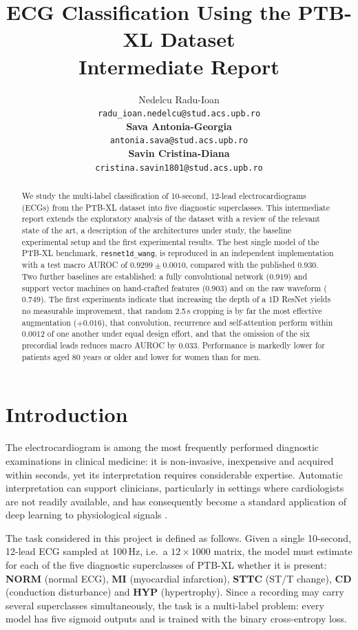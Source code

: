\documentclass{article}
\title{ECG Classification Using the PTB-XL Dataset\\[2pt]\large Intermediate Report}
\author{%
  Nedelcu Radu-Ioan\\
  \texttt{radu\_ioan.nedelcu@stud.acs.upb.ro}\\[4pt]
  \textbf{Sava Antonia-Georgia}\\
  \texttt{antonia.sava@stud.acs.upb.ro}\\[4pt]
  \textbf{Savin Cristina-Diana}\\
  \texttt{cristina.savin1801@stud.acs.upb.ro}
}
\newcommand{\wang}{\texttt{resnet1d\_wang}}
\begin{document}
\maketitle

\begin{abstract}
We study the multi-label classification of 10-second, 12-lead electrocardiograms (ECGs) from the PTB-XL dataset into five diagnostic superclasses. This intermediate report extends the exploratory analysis of the dataset with a review of the relevant state of the art, a description of the architectures under study, the baseline experimental setup and the first experimental results. The best single model of the PTB-XL benchmark, \wang{}, is reproduced in an independent implementation with a test macro AUROC of $0.9299\pm0.0010$, compared with the published $0.930$. Two further baselines are established: a fully convolutional network ($0.919$) and support vector machines on hand-crafted features ($0.903$) and on the raw waveform ($0.749$). The first experiments indicate that increasing the depth of a 1D ResNet yields no measurable improvement, that random 2.5\,s cropping is by far the most effective augmentation ($+0.016$), that convolution, recurrence and self-attention perform within $0.0012$ of one another under equal design effort, and that the omission of the six precordial leads reduces macro AUROC by $0.033$. Performance is markedly lower for patients aged 80 years or older and lower for women than for men.
\end{abstract}

\section{Introduction}

The electrocardiogram is among the most frequently performed diagnostic examinations in clinical medicine: it is non-invasive, inexpensive and acquired within seconds, yet its interpretation requires considerable expertise. Automatic interpretation can support clinicians, particularly in settings where cardiologists are not readily available, and has consequently become a standard application of deep learning to physiological signals \citep{hannun2019,ribeiro2020,strodthoff2021}.

The task considered in this project is defined as follows. Given a single 10-second, 12-lead ECG sampled at 100\,Hz, i.e.\ a $12\times1000$ matrix, the model must estimate for each of the five diagnostic superclasses of PTB-XL \citep{wagner2020} whether it is present: \textbf{NORM} (normal ECG), \textbf{MI} (myocardial infarction), \textbf{STTC} (ST/T change), \textbf{CD} (conduction disturbance) and \textbf{HYP} (hypertrophy). Since a recording may carry several superclasses simultaneously, the task is a multi-label problem: every model has five sigmoid outputs and is trained with the binary cross-entropy loss.
\end{document}
